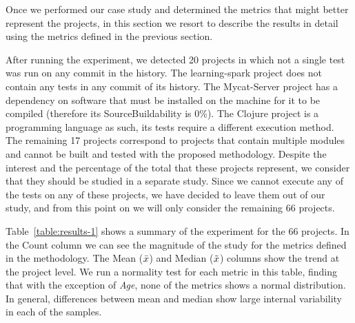 Once we performed our case study and determined the metrics that might better represent the projects, in this section we resort to describe the results in detail using the metrics defined in the previous section.

After running the experiment, we detected 20 projects in which not a single test was run on any commit in the history. 
The learning-spark project does not contain any tests in any commit of its history. 
The Mycat-Server project has a dependency on software that must be installed on the machine for it to be compiled (therefore its SourceBuildability is 0\%). 
The Clojure project is a programming language as such, its tests require a different execution method. 
The remaining 17 projects correspond to projects that contain multiple modules and cannot be built and tested with the proposed methodology. 
Despite the interest and the percentage of the total that these projects represent, we consider that they should be studied in a separate study. 
Since we cannot execute any of the tests on any of these projects, we have decided to leave them out of our study, and from this point on we will only consider the remaining 66 projects.

Table~\ref{table:results-1} shows a summary of the experiment for the 66 projects. 
In the Count column we can see the magnitude of the study for the metrics defined in the methodology. 
The Mean ({\large$\bar{x}$}) and Median ({\large$\tilde{x}$}) columns show the trend at the project level.
We run a normality test for each metric in this table, finding that with the exception of \textit{Age}, none of the metrics shows a normal distribution. 
In general, differences between mean and median show large internal variability in each of the samples.

